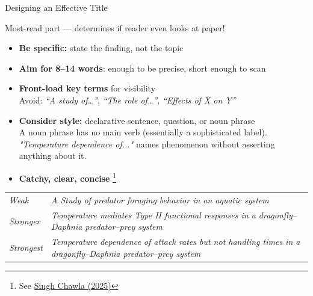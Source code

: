 \documentclass{beamer}
\begin{document}
\begin{frame}{Designing an Effective Title}

  Most-read part --- determines if reader even looks at paper!

  \footnotesize
  \medskip
  \begin{itemize}
    \item \textbf{Be specific:} state the finding, not the topic\\

    \item \textbf{Aim for 8--14 words}: enough to be precise,
      short enough to scan
    \item \textbf{Front-load key terms} for visibility\\
      {\scriptsize Avoid: 
      \textit{``A study of\ldots''}, 
      \textit{``The role of\ldots''}, 
      \textit{``Effects of X on Y''}
      }
    \item \textbf{Consider style:} declarative sentence,
      question, or noun phrase\\
      {\scriptsize A noun phrase has no main verb (essentially a sophisticated label).}
      {\scriptsize \emph{"Temperature dependence of..."} names phenomenon without asserting anything about it.}
    \item \textbf{Catchy, clear, concise}%
    \footnote{See \href{../../readings/pdfs/CatchyClearConcise.pdf}{Singh Chawla (2025)}}
  \end{itemize}

        {\scriptsize
      \begin{tabular}{@{}lp{8cm}@{}}
        \hline
        \textit{Weak}   & \textit{A Study of predator foraging behavior
                          in an aquatic system} \\
        \textit{Stronger} & \textit{Temperature mediates Type II functional
                          responses in a dragonfly--Daphnia predator--prey
                          system} \\
        \textit{Strongest} & \textit{Temperature dependence of attack rates but not
                          handling times in a dragonfly--Daphnia
                          predator--prey system} \\
        \hline
      \end{tabular}
      }

\end{frame}
\end{document}

